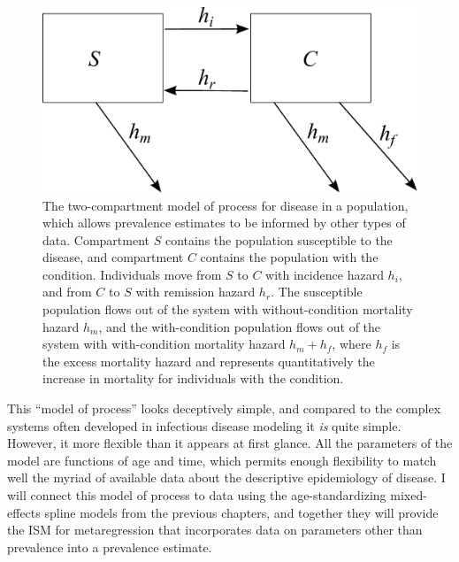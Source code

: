 \begin{figure}[h]
\begin{center}
\includegraphics[width=5in]{SC.pdf}
\caption[The two-compartment model of process for disease in a
  population.]{The two-compartment model of process for disease in a
  population, which allows prevalence estimates to be informed by
  other types of data. Compartment $S$ contains the population
  susceptible to the disease, and compartment $C$ contains the
  population with the condition. Individuals move from $S$ to $C$ with
  incidence hazard $h_i$, and from $C$ to $S$ with remission hazard
  $h_r$. The susceptible population flows out of the system with
  without-condition mortality hazard $h_m$, and the with-condition
  population flows out of the system with with-condition mortality
  hazard $h_m+h_f$, where $h_f$ is the excess mortality hazard and
  represents quantitatively the increase in mortality for
  individuals with the condition.}
\label{forward-sim-two-compartment}
\end{center}
\end{figure}


This ``model of process'' looks deceptively simple, and compared to
the complex systems often developed in infectious disease modeling it
\emph{is} quite simple.  However, it more flexible than it appears at
first glance.  All the parameters of the model are functions of age
and time, which permits enough flexibility to match well the myriad of
available data about the descriptive epidemiology of disease.  I will
connect this model of process to data using the age-standardizing
mixed-effects spline models from the previous chapters, and together
they will provide the ISM for metaregression
that incorporates data on parameters other than prevalence into a
prevalence estimate.

